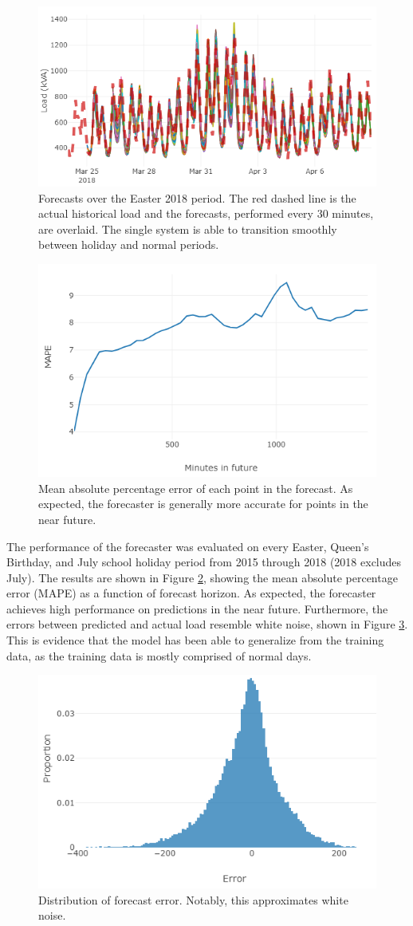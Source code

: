 \documentclass[conference]{IEEEtran}
\begin{document}
\begin{figure}[htbp]
	\centerline{\includegraphics[width=.35\textwidth]{images/easter_2018_all_forecast.png}}
	\caption{Forecasts over the Easter 2018 period.
		The red dashed line is the actual historical load and the forecasts, performed every 30 minutes, are overlaid.
		The single system is able to transition smoothly between holiday and normal periods.}
	\label{fig:easter_forecasts}
\end{figure}

\begin{figure}[htbp]
	\centerline{\includegraphics[width=.35\textwidth]{images/bruny_mape.png}}
	\caption{Mean absolute percentage error of each point in the forecast.
		     As expected, the forecaster is generally more accurate for points in the near future.}
	\label{fig:bruny_mape}
\end{figure}

The performance of the forecaster was evaluated on every Easter, Queen's Birthday, and July school holiday period from 2015 through 2018 (2018 excludes July).
The results are shown in Figure \ref{fig:bruny_mape}, showing the mean absolute percentage error (MAPE) as a function of forecast horizon.
As expected, the forecaster achieves high performance on predictions in the near future.
Furthermore, the errors between predicted and actual load resemble white noise, shown in Figure \ref{fig:bruny_hist}.
This is evidence that the model has been able to generalize from the training data, as the training data is mostly comprised of normal days.

\begin{figure}[htbp]
	\centerline{\includegraphics[width=.35\textwidth]{images/errors_histogram.png}}
	\caption{Distribution of forecast error.
		     Notably, this approximates white noise.}
	\label{fig:bruny_hist}
\end{figure}
\end{document}
